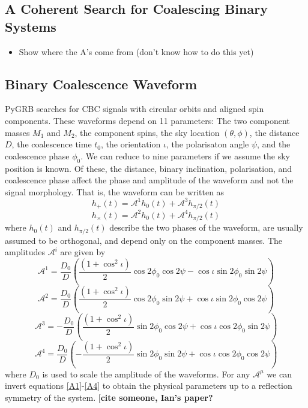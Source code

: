 \documentclass[11pt]{cuthesis}
\begin{document}
\subsection{A Coherent Search for Coalescing Binary Systems}
\begin{itemize}
\item Show where the A's come from (don't know how to do this yet)
\end{itemize}

\subsection{Binary Coalescence Waveform} 
PyGRB searches for CBC signals with circular orbits and aligned spin components. These waveforms depend on 11 parameters: The two component masses $M_1$ and $M_2$, the component spins, the sky location $(\theta, \phi)$, the distance $D$, the coalescence time $t_0$, the orientation $\iota$, the polarisaton angle $\psi$, and the coalescence phase $\phi_0$. We can reduce to nine parameters if we assume the sky position is known. Of these, the distance, binary inclination, polarisation, and coalescence phase affect the phase and amplitude of the waveform and not the signal morphology. That is, the waveform can be written as
\begin{equation} \label{hp}
h_+(t) = \mathcal{A}^1 h_0(t) + \mathcal{A}^3 h_{\pi/2}(t)
\end{equation}
\begin{equation} \label{hx}
h_\times(t) = \mathcal{A}^2 h_0(t) + \mathcal{A}^4 h_{\pi/2}(t)
\end{equation}
where $h_0(t)$ and $h_{\pi/2}(t)$ describe the two phases of the waveform, are usually assumed to be orthogonal, and depend only on the component masses. The amplitudes $\mathcal{A}^i$ are given by 
\begin{equation} \label{A1}
\mathcal{A}^1 = \frac{D_0}{D} \left( \frac{(1+\cos^2 \iota)}{2} \cos 2\phi_0 \cos 2\psi -  \cos \iota \sin 2 \phi_0 \sin 2\psi \right)
\end{equation}
\begin{equation}
\mathcal{A}^2 = \frac{D_0}{D} \left( \frac{(1+\cos^2 \iota)}{2} \cos 2\phi_0 \sin 2\psi +  \cos \iota \sin 2 \phi_0 \cos 2\psi \right)
\end{equation}
\begin{equation}
\mathcal{A}^3 = -\frac{D_0}{D} \left( \frac{(1+\cos^2 \iota)}{2} \sin 2\phi_0 \cos 2\psi +  \cos \iota \cos 2 \phi_0 \sin 2\psi \right)
\end{equation}
\begin{equation} \label{A4}
\mathcal{A}^4 = \frac{D_0}{D} \left( -\frac{(1+\cos^2 \iota)}{2} \sin 2\phi_0 \sin 2\psi +  \cos \iota \cos 2 \phi_0 \cos 2\psi \right)
\end{equation}
where $D_0$ is used to scale the amplitude of the waveforms. For any $\mathcal{A}^\mu$ we can invert equations \ref{A1}-\ref{A4} to obtain the physical parameters up to a reflection symmetry of the system. [\textbf{cite someone, Ian's  paper?} 
\end{document}
